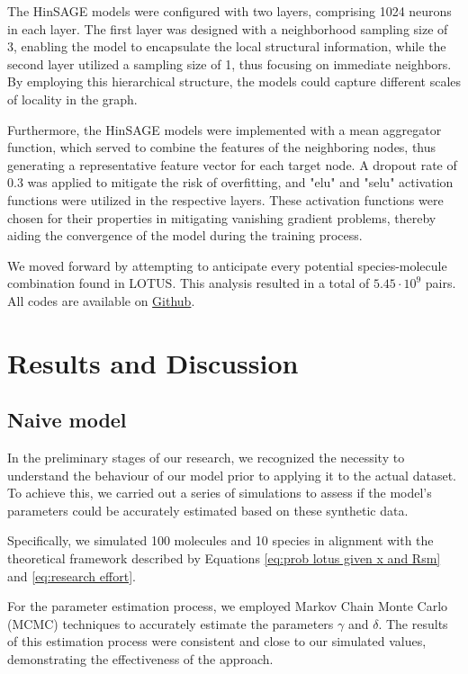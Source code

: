 \documentclass[
11pt, %
oneside, %
english, %
singlespacing, %
headsepline, %
chapterinoneline, %
]{MastersDoctoralThesis} %
\begin{document}
The HinSAGE models were configured with two layers, comprising 1024 neurons in each layer. The first layer was designed with a neighborhood sampling size of 3, enabling the model to encapsulate the local structural information, while the second layer utilized a sampling size of 1, thus focusing on immediate neighbors. By employing this hierarchical structure, the models could capture different scales of locality in the graph.

Furthermore, the HinSAGE models were implemented with a mean aggregator function, which served to combine the features of the neighboring nodes, thus generating a representative feature vector for each target node. A dropout rate of 0.3 was applied to mitigate the risk of overfitting, and "elu" and "selu" activation functions were utilized in the respective layers. These activation functions were chosen for their properties in mitigating vanishing gradient problems, thereby aiding the convergence of the model during the training process. 

We moved forward by attempting to anticipate every potential species-molecule combination found in LOTUS. This analysis resulted in a total of $5.45 \cdot 10^9$ pairs. All codes are available on \href{https://github.com/anticipated-lotus/GNN}{Github}.


\chapter{Results and Discussion}
\section{Naive model}
In the preliminary stages of our research, we recognized the necessity to understand the behaviour of our model prior to applying it to the actual dataset. To achieve this, we carried out a series of simulations to assess if the model's parameters could be accurately estimated based on these synthetic data.

Specifically, we simulated 100 molecules and 10 species in alignment with the theoretical framework described by Equations \ref{eq:prob lotus given x and Rsm} and \ref{eq:research effort}.

For the parameter estimation process, we employed Markov Chain Monte Carlo (MCMC) techniques to accurately estimate the parameters $\gamma$ and $\delta$. The results of this estimation process were consistent and close to our simulated values, demonstrating the effectiveness of the approach.
\end{document}
